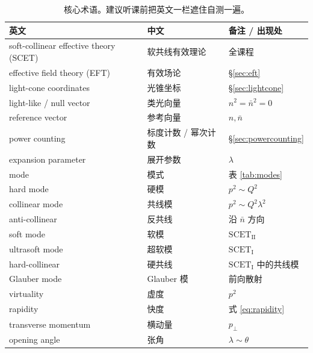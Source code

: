 \documentclass[UTF8,a4paper,11pt]{ctexart}
\theoremstyle{definition}
\theoremstyle{remark}
\theoremstyle{plain}
\newcommand{\SCETI}{\text{SCET}_{\mathrm{I}}}
\newcommand{\SCETII}{\text{SCET}_{\mathrm{II}}}
\begin{document}
\begin{table}[htbp]
\centering
\caption{核心术语。建议听课前把英文一栏遮住自测一遍。}
\label{tab:terms1}
\begin{tabular}{@{}lll@{}}
\toprule
英文 & 中文 & 备注 / 出现处 \\
\midrule
soft-collinear effective theory (SCET) & 软共线有效理论 & 全课程 \\
effective field theory (EFT)      & 有效场论            & \S\ref{sec:eft} \\
light-cone coordinates            & 光锥坐标            & \S\ref{sec:lightcone} \\
light-like / null vector          & 类光向量            & $n^2=\bar n^2=0$ \\
reference vector                  & 参考向量            & $n,\bar n$ \\
power counting                    & 标度计数 / 幂次计数 & \S\ref{sec:powercounting} \\
expansion parameter               & 展开参数            & $\lambda$ \\
mode                              & 模式                & 表 \ref{tab:modes} \\
hard mode                         & 硬模                & $p^2\sim Q^2$ \\
collinear mode                    & 共线模              & $p^2\sim Q^2\lambda^2$ \\
anti-collinear                    & 反共线              & 沿 $\bar n$ 方向 \\
soft mode                         & 软模                & $\SCETII$ \\
ultrasoft mode                    & 超软模              & $\SCETI$ \\
hard-collinear                    & 硬共线              & $\SCETI$ 中的共线模 \\
Glauber mode                      & Glauber 模          & 前向散射 \\
virtuality                        & 虚度                & $p^2$ \\
rapidity                          & 快度                & 式 \eqref{eq:rapidity} \\
transverse momentum               & 横动量              & $p_\perp$ \\
opening angle                     & 张角                & $\lambda\sim\theta$ \\
\bottomrule
\end{tabular}
\end{table}
\end{document}
